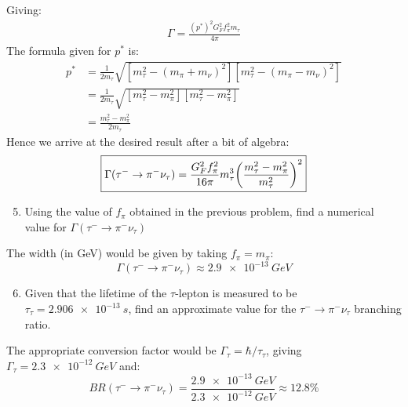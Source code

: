 \documentclass[12pt]{article}
\begin{document}
Giving:
\begin{align*}
  \Gamma=\frac{{(p^*)}^2G_F^2f_\pi^2m_\tau}{4\pi}
\end{align*}
The formula given for $p^*$ is:
\begin{align*}
  p^*&=\frac1{2m_\tau}
  \sqrt{[m_\tau^2-{(m_\pi+m_\nu)}^2][m_\tau^2-{(m_\pi-m_\nu)}^2]}\\
  &=\frac1{2m_\tau}\sqrt{[m_\tau^2-m_\pi^2][m_\tau^2-m_\pi^2]}\\
  &=\frac{m_\tau^2-m_\pi^2}{2m_\tau}
\end{align*}
Hence we arrive at the desired result after a bit of algebra:
\begin{equation}
  \label{eq:p5d}
  \boxed{\Gamma(\tau^-\to\pi^-\nu_\tau)=\frac{G_F^2f_\pi^2}{16\pi}
  m_\tau^3{\qty(\frac{m_\tau^2-m_\pi^2}{m_\tau^2})}^2}
\end{equation}
\begin{problem}
  \begin{enumerate}[label = (\alph*)]
    \setcounter{enumi}{4}
  \item Using the value of $f_\pi$ obtained in the previous problem, find a numerical value for $\Gamma(\tau^-\to\pi^-\nu_\tau)$
  \end{enumerate}
\end{problem}
The width (in GeV) would be given by taking $f_\pi=m_\pi$:
\begin{equation}
  \label{eq:p5e}
  \boxed{\Gamma(\tau^-\to\pi^-\nu_\tau)\approx\SI{2.9e-13}{GeV}}
\end{equation}
\begin{problem}
  \begin{enumerate}[label = (\alph*)]
    \setcounter{enumi}{5}
  \item Given that the lifetime of the $\tau$-lepton is measured to be $\tau_\tau=\SI{2.906e-13}{s}$, find an approximate value for the $\tau^-\to\pi^-\nu_\tau$ branching ratio.
  \end{enumerate}
\end{problem}
The appropriate conversion factor would be $\Gamma_\tau=\hbar/\tau_\tau$, giving $\Gamma_\tau=\SI{2.3e-12}{GeV}$ and:
\begin{equation}
  \label{eq:p5f}
  \boxed{BR(\tau^-\to\pi^-\nu_\tau)
    =\frac{\SI{2.9e-13}{GeV}}{\SI{2.3e-12}{GeV}}
  \approx12.8\%}
\end{equation}
\newpage
\end{document}

